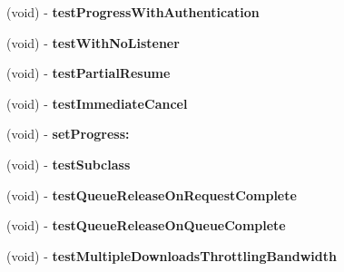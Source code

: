 \begin{DoxyCompactItemize}
\item 
\hypertarget{interface_a_s_i_network_queue_tests_aa1ec111c87e8672ac36cf638d41acb23}{
(void) -\/ {\bfseries test\-Progress\-With\-Authentication}}
\label{interface_a_s_i_network_queue_tests_aa1ec111c87e8672ac36cf638d41acb23}

\item 
\hypertarget{interface_a_s_i_network_queue_tests_a3ed1658a28f4bc0ac237d7c3793f53f1}{
(void) -\/ {\bfseries test\-With\-No\-Listener}}
\label{interface_a_s_i_network_queue_tests_a3ed1658a28f4bc0ac237d7c3793f53f1}

\item 
\hypertarget{interface_a_s_i_network_queue_tests_a3504066fbf5ecc526035321cf0a0d74a}{
(void) -\/ {\bfseries test\-Partial\-Resume}}
\label{interface_a_s_i_network_queue_tests_a3504066fbf5ecc526035321cf0a0d74a}

\item 
\hypertarget{interface_a_s_i_network_queue_tests_a5621d435f7e0be616841da617af3ae7b}{
(void) -\/ {\bfseries test\-Immediate\-Cancel}}
\label{interface_a_s_i_network_queue_tests_a5621d435f7e0be616841da617af3ae7b}

\item 
\hypertarget{interface_a_s_i_network_queue_tests_aaa3ee5989847c5200d079241b5527795}{
(void) -\/ {\bfseries set\-Progress\-:}}
\label{interface_a_s_i_network_queue_tests_aaa3ee5989847c5200d079241b5527795}

\item 
\hypertarget{interface_a_s_i_network_queue_tests_a6c75d4f9034d8f96da30002fa7c39f6a}{
(void) -\/ {\bfseries test\-Subclass}}
\label{interface_a_s_i_network_queue_tests_a6c75d4f9034d8f96da30002fa7c39f6a}

\item 
\hypertarget{interface_a_s_i_network_queue_tests_a6ebc6405b8f6639be717def3dcbcd617}{
(void) -\/ {\bfseries test\-Queue\-Release\-On\-Request\-Complete}}
\label{interface_a_s_i_network_queue_tests_a6ebc6405b8f6639be717def3dcbcd617}

\item 
\hypertarget{interface_a_s_i_network_queue_tests_a8367da7729b914e691602cbfbb0cd4d6}{
(void) -\/ {\bfseries test\-Queue\-Release\-On\-Queue\-Complete}}
\label{interface_a_s_i_network_queue_tests_a8367da7729b914e691602cbfbb0cd4d6}

\item 
\hypertarget{interface_a_s_i_network_queue_tests_afecabb41732addf7e0b63960536af284}{
(void) -\/ {\bfseries test\-Multiple\-Downloads\-Throttling\-Bandwidth}}
\label{interface_a_s_i_network_queue_tests_afecabb41732addf7e0b63960536af284}


\end{DoxyCompactItemize}
